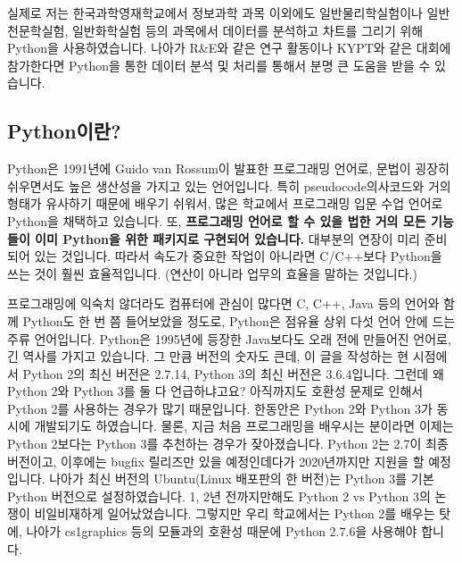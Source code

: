 \documentclass[../main.tex]{subfiles}
\begin{document}
실제로 저는 한국과학영재학교에서 정보과학 과목 이외에도 일반물리학실험이나 일반천문학실험, 일반화학실험 등의 과목에서 데이터를 분석하고 차트를 그리기 위해 Python을 사용하였습니다.
나아가 R\&E와 같은 연구 활동이나 KYPT와 같은 대회에 참가한다면 Python을 통한 데이터 분석 및 처리를 통해서 분명 큰 도움을 받을 수 있습니다.

\subsection{Python이란?}
Python은 1991년에 Guido van Rossum이 발표한 프로그래밍 언어로, 문법이 굉장히 쉬우면서도 높은 생산성을 가지고 있는 언어입니다.
특히 pseudocode의사코드와 거의 형태가 유사하기 때문에 배우기 쉬워서, 많은 학교에서 프로그래밍 입문 수업 언어로 Python을 채택하고 있습니다.
또, \textbf{프로그래밍 언어로 할 수 있을 법한 거의 모든 기능들이 이미 Python을 위한 패키지로 구현되어 있습니다.}
대부분의 연장이 미리 준비되어 있는 것입니다.
따라서 속도가 중요한 작업이 아니라면 C/C++보다 Python을 쓰는 것이 훨씬 효율적입니다. (연산이 아니라 업무의 효율을 말하는 것입니다.)

프로그래밍에 익숙치 않더라도 컴퓨터에 관심이 많다면 C, C++, Java 등의 언어와 함께 Python도 한 번 쯤 들어보았을 정도로, Python은 점유율 상위 다섯 언어 안에 드는 주류 언어입니다.
Python은 1995년에 등장한 Java보다도 오래 전에 만들어진 언어로, 긴 역사를 가지고 있습니다.
그 만큼 버전의 숫자도 큰데, 이 글을 작성하는 현 시점에서 Python 2의 최신 버전은 2.7.14, Python 3의 최신 버전은 3.6.4입니다.
그런데 왜 Python 2와 Python 3를 둘 다 언급하냐고요?
아직까지도 호환성 문제로 인해서 Python 2를 사용하는 경우가 많기 때문입니다.
한동안은 Python 2와 Python 3가 동시에 개발되기도 하였습니다.
물론, 지금 처음 프로그래밍을 배우시는 분이라면 이제는 Python 2보다는 Python 3를 추천하는 경우가 잦아졌습니다.
Python 2는 2.7이 최종 버전이고, 이후에는 bugfix 릴리즈만 있을 예정인데다가 2020년까지만 지원을 할 예정입니다.
나아가 최신 버전의 Ubuntu(Linux 배포판의 한 버전)는 Python 3를 기본 Python 버전으로 설정하였습니다.
1, 2년 전까지만해도 Python 2 vs Python 3의 논쟁이 비일비재하게 일어났었습니다.
그렇지만 우리 학교에서는 Python 2를 배우는 탓에, 나아가 cs1graphics 등의 모듈과의 호환성 때문에 Python 2.7.6을 사용해야 합니다.
\end{document}
